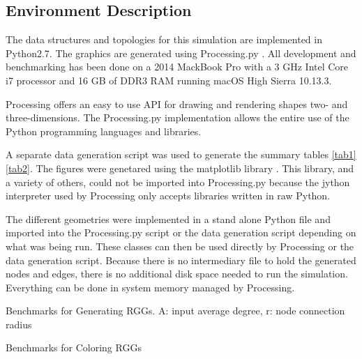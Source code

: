 \documentclass{article}
\begin{document}
    \subsection{Environment Description}
    The data structures and topologies for this simulation are implemented in Python2.7. The graphics are generated using Processing.py \cite{processing}. All development and benchmarking has been done on a 2014 MackBook Pro with a 3 GHz Intel Core i7 processor and 16 GB of DDR3 RAM running macOS High Sierra 10.13.3.
    \par
    Processing offers an easy to use API for drawing and rendering shapes two- and three-dimensions. The Processing.py implementation allows the entire use of the Python programming languages and libraries.
    \par
    A separate data generation script was used to generate the summary tables \ref{tab1}\ref{tab2}. The figures were genetared using the matplotlib library \cite{matplotlib}. This library, and a variety of others, could not be imported into Processing.py because the jython interpreter used by Processing only accepts libraries written in raw Python.
    \par
    The different geometries were implemented in a stand alone Python file and imported into the Processing.py script or the data generation script depending on what was being run. These classes can then be used directly by Processing or the data generation script. Because there is no intermediary file to hold the generated nodes and edges, there is no additional disk space needed to run the simulation. Everything can be done in system memory managed by Processing.

    \begin{center}
        \begin{table}[h]
            \centering
            \caption{Benchmarks for Generating RGGs. A: input average degree, r: node connection radius}
            \label{tab1}
        \end{table}
    \end{center}

    \begin{center}
        \begin{table}[h]
            \centering
            \caption{Benchmarks for Coloring RGGs}
            \label{tab2}
        \end{table}
    \end{center}
\end{document}
